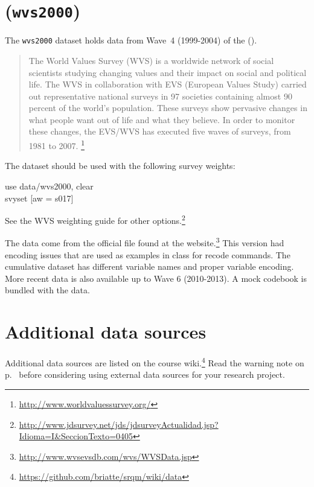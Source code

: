 \section*{\wvs (\texttt{wvs2000})}

The \texttt{wvs2000} dataset holds data from Wave~4 (1999-2004) of the \wvs (\WVS).

\begin{quote}
	The World Values Survey (WVS) is a worldwide network of social scientists studying changing values and their impact on social and political life. The WVS in collaboration with EVS (European Values Study) carried out representative national surveys in 97 societies containing almost 90 percent of the world's population. These surveys show pervasive changes in what people want out of life and what they believe. In order to monitor these changes, the EVS/WVS has executed five waves of surveys, from 1981 to 2007.%
	\footnote{\url{http://www.worldvaluessurvey.org/}}
\end{quote}

The \WVS dataset should be used with the following survey weights:

\begin{docspec}
	use data/wvs2000, clear\\
	svyset [aw = s017]
\end{docspec}

See the WVS weighting guide for other options.\footnote{\url{http://www.jdsurvey.net/jds/jdsurveyActualidad.jsp?Idioma=I&SeccionTexto=0405}}

The data come from the  official file found at the \WVS website.\footnote{\url{http://www.wvsevsdb.com/wvs/WVSData.jsp}} This version had encoding issues that are used as examples in class for recode commands. The cumulative dataset has different variable names and proper variable encoding. More recent data is also available up to Wave 6 (2010-2013). A mock codebook is bundled with the data.

\section*{Additional data sources}

Additional data sources are listed on the course wiki.\footnote{\url{https://github.com/briatte/srqm/wiki/data}} Read the warning note on p.~\pageref{external-data-warning} before considering using external data sources for your research project.
